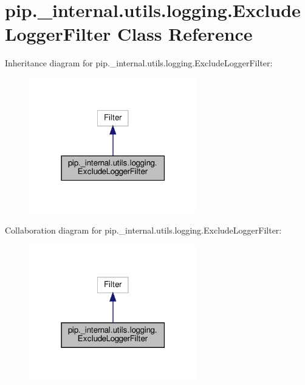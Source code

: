 \hypertarget{classpip_1_1__internal_1_1utils_1_1logging_1_1ExcludeLoggerFilter}{}\section{pip.\+\_\+internal.\+utils.\+logging.\+Exclude\+Logger\+Filter Class Reference}
\label{classpip_1_1__internal_1_1utils_1_1logging_1_1ExcludeLoggerFilter}


Inheritance diagram for pip.\+\_\+internal.\+utils.\+logging.\+Exclude\+Logger\+Filter\+:
\nopagebreak
\begin{figure}[H]
\begin{center}
\leavevmode
\includegraphics[width=207pt]{classpip_1_1__internal_1_1utils_1_1logging_1_1ExcludeLoggerFilter__inherit__graph}
\end{center}
\end{figure}


Collaboration diagram for pip.\+\_\+internal.\+utils.\+logging.\+Exclude\+Logger\+Filter\+:
\nopagebreak
\begin{figure}[H]
\begin{center}
\leavevmode
\includegraphics[width=207pt]{classpip_1_1__internal_1_1utils_1_1logging_1_1ExcludeLoggerFilter__coll__graph}
\end{center}
\end{figure}
